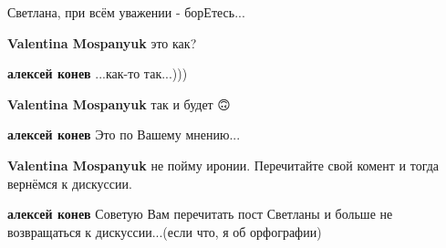 \begin{itemize}
Светлана, при всём уважении - борЕтесь...

\begin{itemize}
 
\textbf{Valentina Mospanyuk} это как?

 
\textbf{алексей конев} ...как-то так...)))

 
\textbf{Valentina Mospanyuk} так и будет 🙃

 
\textbf{алексей конев} Это по Вашему мнению...

 
\textbf{Valentina Mospanyuk} не пойму иронии. Перечитайте свой комент и тогда вернёмся к дискуссии.

 
\textbf{алексей конев} Советую Вам перечитать пост Светланы и больше не возвращаться к дискуссии...(если что, я об орфографии)


\end{itemize}
\end{itemize}
